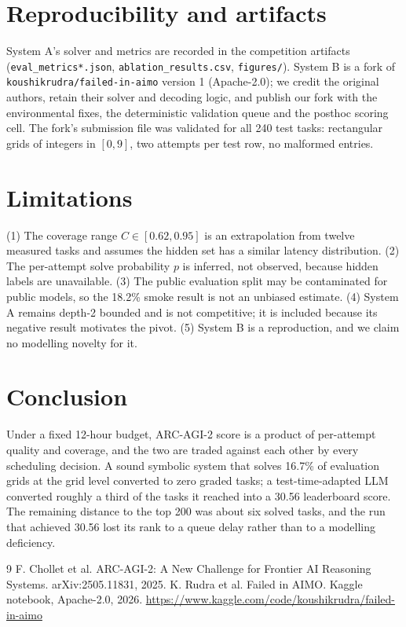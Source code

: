 \documentclass[11pt,a4paper]{article}
\begin{document}
\section{Reproducibility and artifacts}

System A's solver and metrics are recorded in the competition artifacts (\texttt{eval\_metrics*.json}, \texttt{ablation\_results.csv}, \texttt{figures/}). System B is a fork of \texttt{koushikrudra/failed-in-aimo} version 1 (Apache-2.0); we credit the original authors, retain their solver and decoding logic, and publish our fork with the environmental fixes, the deterministic validation queue and the posthoc scoring cell. The fork's submission file was validated for all 240 test tasks: rectangular grids of integers in $[0,9]$, two attempts per test row, no malformed entries.

\section{Limitations}

(1) The coverage range $C \in [0.62,0.95]$ is an extrapolation from twelve measured tasks and assumes the hidden set has a similar latency distribution. (2) The per-attempt solve probability $p$ is inferred, not observed, because hidden labels are unavailable. (3) The public evaluation split may be contaminated for public models, so the 18.2\% smoke result is not an unbiased estimate. (4) System A remains depth-2 bounded and is not competitive; it is included because its negative result motivates the pivot. (5) System B is a reproduction, and we claim no modelling novelty for it.

\section{Conclusion}

Under a fixed 12-hour budget, ARC-AGI-2 score is a product of per-attempt quality and coverage, and the two are traded against each other by every scheduling decision. A sound symbolic system that solves 16.7\% of evaluation grids at the grid level converted to zero graded tasks; a test-time-adapted LLM converted roughly a third of the tasks it reached into a 30.56 leaderboard score. The remaining distance to the top 200 was about six solved tasks, and the run that achieved 30.56 lost its rank to a queue delay rather than to a modelling deficiency.

\begin{thebibliography}{9}
 F. Chollet et al. ARC-AGI-2: A New Challenge for Frontier AI Reasoning Systems. arXiv:2505.11831, 2025.
 K. Rudra et al. Failed in AIMO. Kaggle notebook, Apache-2.0, 2026. \url{https://www.kaggle.com/code/koushikrudra/failed-in-aimo}
\end{thebibliography}
\end{document}
